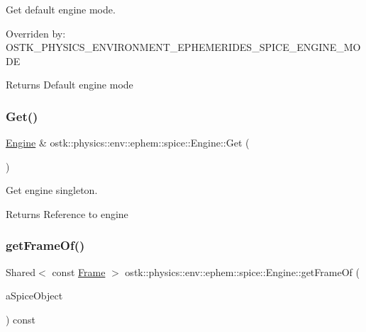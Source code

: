 Get default engine mode. 

Overriden by\+: O\+S\+T\+K\+\_\+\+P\+H\+Y\+S\+I\+C\+S\+\_\+\+E\+N\+V\+I\+R\+O\+N\+M\+E\+N\+T\+\_\+\+E\+P\+H\+E\+M\+E\+R\+I\+D\+E\+S\+\_\+\+S\+P\+I\+C\+E\+\_\+\+E\+N\+G\+I\+N\+E\+\_\+\+M\+O\+DE

\begin{DoxyReturn}{Returns}
Default engine mode 
\end{DoxyReturn}
\mbox{\label{classostk_1_1physics_1_1env_1_1ephem_1_1spice_1_1_engine_a98ce9249db18853920308c699fbca541}} 
\subsubsection{\texorpdfstring{Get()}{Get()}}
{\footnotesize\ttfamily \hyperlink{classostk_1_1physics_1_1env_1_1ephem_1_1spice_1_1_engine}{Engine} \& ostk\+::physics\+::env\+::ephem\+::spice\+::\+Engine\+::\+Get (\begin{DoxyParamCaption}{ }\end{DoxyParamCaption})\hspace{0.3cm}{\ttfamily [static]}}



Get engine singleton. 

\begin{DoxyReturn}{Returns}
Reference to engine 
\end{DoxyReturn}
\mbox{\label{classostk_1_1physics_1_1env_1_1ephem_1_1spice_1_1_engine_aeffd094033f2bd2c276b9d9a9840d7ea}} 
\subsubsection{\texorpdfstring{get\+Frame\+Of()}{getFrameOf()}}
{\footnotesize\ttfamily Shared$<$ const \hyperlink{classostk_1_1physics_1_1coord_1_1_frame}{Frame} $>$ ostk\+::physics\+::env\+::ephem\+::spice\+::\+Engine\+::get\+Frame\+Of (\begin{DoxyParamCaption}\item[{const \hyperlink{classostk_1_1physics_1_1env_1_1ephem_1_1_s_p_i_c_e_ae84db78d858cdd0a1dc3ff53090f4a1f}{S\+P\+I\+C\+E\+::\+Object} \&}]{a\+Spice\+Object }\end{DoxyParamCaption}) const}



